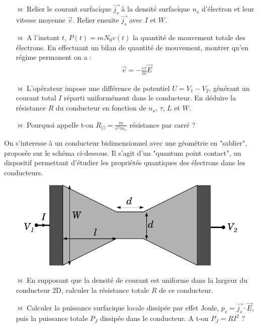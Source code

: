 \documentclass{report}
\begin{document}
\begin{itemize}

	\item[$\bowtie$] Relier le courant surfacique $\vec{j_s}$ à la densité surfacique $n_s$ d'électron et leur vitesse moyenne $\vec{v}$. Relier ensuite $\vec{j_s}$ avec $I$ et $W$.

	\item[$\bowtie$] A l'instant $t$, $P(t)=mN_0v(t)$ la quantité de mouvement totale des électrons. En effectuant un bilan de quantité de mouvement, montrer qu'en régime permanent on a :
	\begin{align*}
		\vec{v}=-\frac{e\tau}{m}\vec{E}
	\end{align*}
	
	\item[$\bowtie$] L'opérateur impose une différence de potentiel $U=V_1-V_2$, générant un courant total $I$ réparti uniformément dans le conducteur. En déduire la résistance $R$ du conducteur en fonction de $n_s$, $\tau$, $L$ et $W$.
	
	\item[$\bowtie$] Pourquoi appelle t-on $R_\boxdot=\frac{m}{e^2\tau n_s}$ résistance par carré ?
	
\end{itemize}

On s'interesse à un conducteur bidimensionnel avec une géométrie en "sablier", proposée sur le schéma ci-dessous. Il s'agit d'un "quantum point contact", un dispositif permettant d'étudier les propriétés quantiques des électrons dans les conducteurs.

\begin{figure}[h!]
\centering
		\includegraphics[scale=0.5]{2DEG_QPC.pdf}
\end{figure}

\begin{itemize}

	\item[$\bowtie$] En supposant que la densité de courant est uniforme dans la largeur du conducteur 2D, calculer la résistance totale $R$ de ce conducteur.
	
	\item[$\bowtie$] Calculer la puissance surfacique locale dissipée par effet Joule, $p_s=\vec{j_s}\cdot\vec{E}$, puis la puissance totale $P_J$ dissipée dans le conducteur. A t-on $P_J=RI^2$ ?

\end{itemize}
\end{document}
